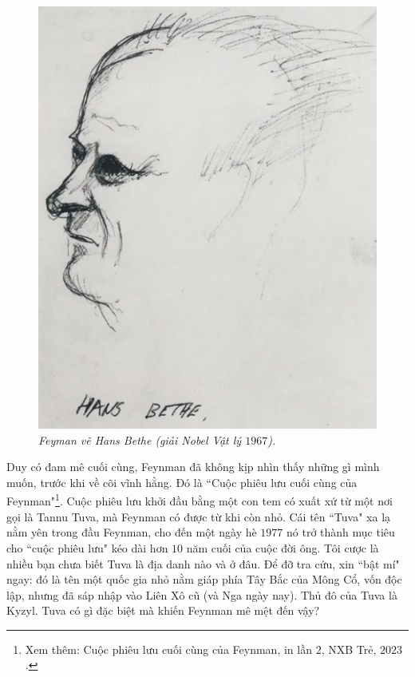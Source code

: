 \begin{multicols}{2}
	\begin{figure}[H]
		\vspace*{-5pt}
		\centering
		\captionsetup{labelformat= empty, justification=centering}
		\includegraphics[width= 1\linewidth]{3a}
		\caption{\small\textit{\color{quantoan}Feyman vẽ Hans Bethe (giải Nobel Vật lý $1967$).}}
		\vspace*{-10pt}
	\end{figure}
	Duy có đam mê cuối cùng, Feynman đã không kịp nhìn thấy những gì mình muốn, trước khi về cõi vĩnh hằng. Đó là ``Cuộc phiêu lưu cuối cùng của Feynman"\footnote[2]{\color{quantoan}Xem thêm: Cuộc phiêu lưu cuối cùng của Feynman, in lần $2$, NXB Trẻ, $2023$.}. Cuộc phiêu lưu khởi đầu bằng một con tem có xuất xứ từ một nơi gọi là Tannu Tuva, mà Feynman có được từ khi còn nhỏ. Cái tên ``Tuva" xa lạ nằm yên trong đầu Feynman, cho đến một ngày hè $1977$ nó trở thành mục tiêu cho ``cuộc phiêu lưu" kéo dài hơn $10$ năm cuối của cuộc đời ông. Tôi cược là nhiều bạn chưa biết Tuva là địa danh nào và ở đâu. Để đỡ tra cứu, xin ``bật mí" ngay: đó là tên một quốc gia nhỏ nằm giáp phía Tây Bắc của Mông Cổ, vốn độc lập, nhưng đã sáp nhập vào Liên Xô cũ (và Nga ngày nay). Thủ đô của Tuva là Kyzyl. Tuva có gì đặc biệt mà khiến Feynman mê mệt đến vậy?

\end{multicols}

